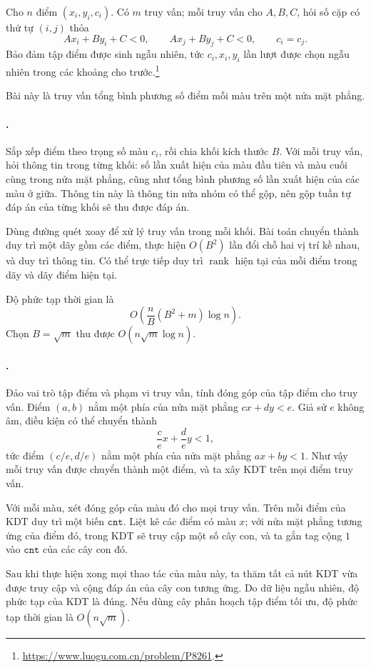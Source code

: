 \documentclass[11pt]{article}
\begin{document}
Cho \(n\) điểm \((x_i,y_i,c_i)\). Có \(m\) truy vấn; mỗi truy vấn cho
\(A,B,C\), hỏi số cặp có thứ tự \((i,j)\) thỏa
\[
  Ax_i+By_i+C<0,\qquad Ax_j+By_j+C<0,\qquad c_i=c_j.
\]
Bảo đảm tập điểm được sinh ngẫu nhiên, tức \(c_i,x_i,y_i\) lần lượt được chọn
ngẫu nhiên trong các khoảng cho trước.\footnote{\url{https://www.luogu.com.cn/problem/P8261}.}

Bài này là truy vấn tổng bình phương số điểm mỗi màu trên một nửa mặt phẳng.

\paragraph{.}
Sắp xếp điểm theo trọng số màu \(c_i\), rồi chia khối kích thước \(B\). Với mỗi
truy vấn, hỏi thông tin trong từng khối: số lần xuất hiện của màu đầu tiên và
màu cuối cùng trong nửa mặt phẳng, cũng như tổng bình phương số lần xuất hiện
của các màu ở giữa. Thông tin này là thông tin nửa nhóm có thể gộp, nên gộp
tuần tự đáp án của từng khối sẽ thu được đáp án.

Dùng đường quét xoay để xử lý truy vấn trong mỗi khối. Bài toán chuyển thành
duy trì một dãy gồm các điểm, thực hiện \(O(B^2)\) lần đổi chỗ hai vị trí kề
nhau, và duy trì thông tin. Có thể trực tiếp duy trì \(\operatorname{rank}\)
hiện tại của mỗi điểm trong dãy và dãy điểm hiện tại.

Độ phức tạp thời gian là
\[
  O\left(\frac{n}{B}(B^2+m)\log n\right).
\]
Chọn \(B=\sqrt m\) thu được \(O(n\sqrt m\log n)\).

\paragraph{.}
Đảo vai trò tập điểm và phạm vi truy vấn, tính đóng góp của tập điểm cho truy
vấn. Điểm \((a,b)\) nằm một phía của nửa mặt phẳng \(cx+dy<e\). Giả sử
\(e\) không âm, điều kiện có thể chuyển thành
\[
  \frac{c}{e}x+\frac{d}{e}y<1,
\]
tức điểm \((c/e,d/e)\) nằm một phía của nửa mặt phẳng \(ax+by<1\). Như vậy mỗi
truy vấn được chuyển thành một điểm, và ta xây KDT trên mọi điểm truy vấn.

Với mỗi màu, xét đóng góp của màu đó cho mọi truy vấn. Trên mỗi điểm của KDT
duy trì một biến \(\mathtt{cnt}\). Liệt kê các điểm có màu \(x\); với nửa mặt
phẳng tương ứng của điểm đó, trong KDT sẽ truy cập một số cây con, và ta gắn
tag cộng \(1\) vào \(\mathtt{cnt}\) của các cây con đó.

Sau khi thực hiện xong mọi thao tác của màu này, ta thăm tất cả nút KDT vừa
được truy cập và cộng đáp án của cây con tương ứng. Do dữ liệu ngẫu nhiên, độ
phức tạp của KDT là đúng. Nếu dùng cây phân hoạch tập điểm tối ưu, độ phức tạp
thời gian là \(O(n\sqrt m)\).
\end{document}
